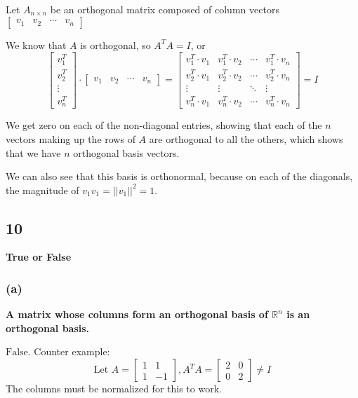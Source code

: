 \documentclass[10pt,letterpaper]{article}
\begin{document}
	Let $A_{n \times n}$ be an orthogonal matrix composed of column vectors $\begin{bmatrix}
	v_1 & v_2 & \cdots & v_n
	\end{bmatrix}$  
	
	We know that $A$ is orthogonal, so $A^TA = I$, or 
	$$
	\begin{bmatrix}
	v^T_1  \\ v^T_2 \\ \vdots \\ v_n^T
	\end{bmatrix} \cdot \begin{bmatrix}
	v_1 & v_2 & \cdots & v_n
	\end{bmatrix} = \begin{bmatrix}
	v_1^T \cdot v_1  & v_1^T \cdot v_2 & \cdots & v_1^T \cdot v_n \\ 
	v_2^T \cdot v_1  & v_2^T \cdot v_2 & \cdots & v_2^T \cdot v_n \\
	\vdots & \vdots & \ddots & \vdots \\ 
	v_n^T \cdot v_1 & v_n^T \cdot v_2 & \cdots & v_n^T \cdot v_n
	\end{bmatrix} = I
	$$
	
	We get zero on each of the non-diagonal entries, showing that each of the $n$ vectors making up the rows of $A$ are orthogonal to all the others, which shows that we have $n$ orthogonal basis vectors.  
	
	We can also see that this basis is orthonormal, because on each of the diagonals, the magnitude of $v_1 v_1 = ||v_1||^2 = 1$. 
	\subsection*{10}  \textbf{True or False}
	\subsubsection*{(a)} \textbf{A matrix whose columns form an orthogonal basis of $\mathbb{R}^n$ is an orthogonal basis.} 
	
	$\boxed{\text{False}}$. Counter example: 
	$$
	\text{Let } A= \begin{bmatrix}
	1 & 1 \\ 1 & -1
	\end{bmatrix}, A^TA = \begin{bmatrix}
	2 & 0 \\ 0 & 2
	\end{bmatrix} \neq I
	$$ 
	The columns must be normalized for this to work. 
\end{document}
